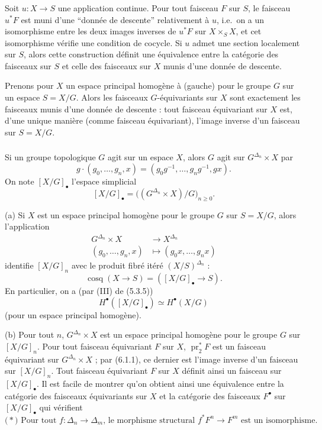 \documentclass[11pt]{amsart}
\theoremstyle{plain}
\theoremstyle{definition}
\DeclareMathOperator{\cosq}{cosq}
\DeclareMathOperator{\pr}{pr}
\begin{document}
\subsubsection{}
Soit $u : X \to S$ une application continue. Pour tout faisceau $F$ sur $S$, le faisceau $u^* F$ est muni d'une ``donn\'ee de descente'' relativement \`a $u$, i.e.\ on a un isomorphisme entre les deux images inverses de $u^* F$ sur $X \times_S X$, et cet isomorphisme v\'erifie une condition de cocycle. Si $u$ admet une section localement sur $S$, alors cette construction d\'efinit une \'equivalence entre la cat\'egorie des faisceaux sur $S$ et celle des faisceaux sur $X$ munis d'une donn\'ee de descente.

Prenons pour $X$ un espace principal homog\`ene \`a (gauche) pour le groupe $G$ sur un espace $S = X/G$. Alors les faisceaux $G$-\'equivariants sur $X$ sont exactement les faisceaux munis d'une donn\'ee de descente : tout faisceau \'equivariant sur $X$ est, d'une unique mani\`ere (comme faisceau \'equivariant), l'image inverse d'un faisceau sur $S = X/G$.

\subsubsection{}
Si un groupe topologique $G$ agit sur un espace $X$, alors $G$ agit sur $G^{\Delta_n} \times X$ par
\[
g \cdot (g_0, \ldots, g_n, x) = (g_0 g^{-1}, \ldots, g_n g^{-1}, gx).
\]
On note $[X/G]_\bullet$ l'espace simplicial
\begin{equation}\label{eq:6.1.2.1}
[X/G]_\bullet = \big((G^{\Delta_n} \times X)/G\big)_{n \geq 0}.
\end{equation}

(a) Si $X$ est un espace principal homog\`ene pour le groupe $G$ sur $S = X/G$, alors l'application
\[
\begin{aligned}
G^{\Delta_n} \times X &\to X^{\Delta_n} \\
(g_0, \ldots, g_n, x) &\mapsto (g_0 x, \ldots, g_n x)
\end{aligned}
\]
identifie $[X/G]_n$ avec le produit fibr\'e it\'er\'e $(X/S)^{\Delta_n}$ :
\[
\cosq(X \to S) = ([X/G]_\bullet \to S).
\]
En particulier, on a (par (III) de (5.3.5))
\begin{equation}\label{eq:6.1.2.2}
H^\bullet([X/G]_\bullet) \simeq H^\bullet(X/G)
\end{equation}
(pour un espace principal homog\`ene).

(b) Pour tout $n$, $G^{\Delta_n} \times X$ est un espace principal homog\`ene pour le groupe $G$ sur $[X/G]_n$. Pour tout faisceau \'equivariant $F$ sur $X$, $\pr_2^* F$ est un faisceau \'equivariant sur $G^{\Delta_n} \times X$ ; par (6.1.1), ce dernier est l'image inverse d'un faisceau sur $[X/G]_n$. Tout faisceau \'equivariant $F$ sur $X$ d\'efinit ainsi un faisceau sur $[X/G]_\bullet$. Il est facile de montrer qu'on obtient ainsi une \'equivalence entre la cat\'egorie des faisceaux \'equivariants sur $X$ et la cat\'egorie des faisceaux $F^\bullet$ sur $[X/G]_\bullet$ qui v\'erifient
\begin{equation*}
\text{($*$) Pour tout $f : \Delta_n \to \Delta_m$, le morphisme structural $f^* F^n \to F^m$ est un isomorphisme.}
\end{equation*}
\end{document}
